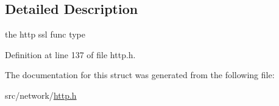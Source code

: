 \subsection{Detailed Description}
the http ssl func type 

Definition at line 137 of file http.\-h.



The documentation for this struct was generated from the following file\-:\begin{DoxyCompactItemize}
\item 
src/network/\hyperlink{http_8h}{http.\-h}\end{DoxyCompactItemize}
